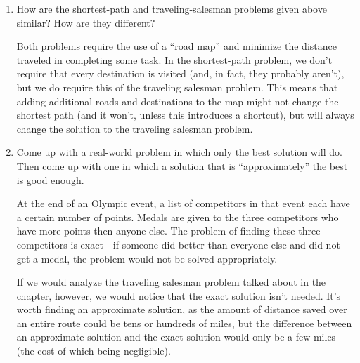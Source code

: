\documentclass[Chapter01]{subfiles}
\begin{document}
\begin{enumerate}[leftmargin=\labelsep]
		\item How are the shortest-path and traveling-salesman problems given above similar? How are they different?
		\begin{answer}
			Both problems require the use of a ``road map'' and minimize the distance traveled in completing some task. In the shortest-path problem, we don't require that every destination is visited (and, in fact, they probably aren't), but we do require this of the traveling salesman problem. This means that adding additional roads and destinations to the map might not change the shortest path (and it won't, unless this introduces a shortcut), but will always change the solution to the traveling salesman problem.
		\end{answer}

		\item Come up with a real-world problem in which only the best solution will do. Then come up with one in which a solution that is ``approximately'' the best is good enough.
		\begin{answer}
			At the end of an Olympic event, a list of competitors in that event each have a certain number of points. Medals are given to the three competitors who have more points then anyone else. The problem of finding these three competitors is exact - if someone did better than everyone else and did not get a medal, the problem would not be solved appropriately.
			
			If we would analyze the traveling salesman problem talked about in the chapter, however, we would notice that the exact solution isn't needed. It's worth finding an approximate solution, as the amount of distance saved over an entire route could be tens or hundreds of miles, but the difference between an approximate solution and the exact solution would only be a few miles (the cost of which being negligible).
		\end{answer}
	\end{enumerate}
\end{document}

